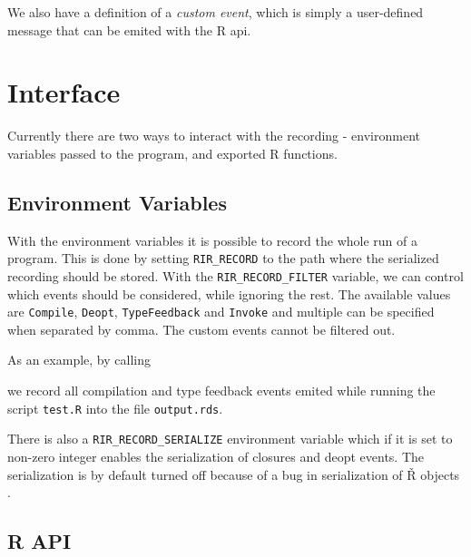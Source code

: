 We also have a definition of a \textit{custom event}, which is simply a user-defined message that can be emited with the R api.

\section{Interface}

Currently there are two ways to interact with the recording - environment variables passed to the program, and exported R functions.

\subsection*{Environment Variables}

With the environment variables it is possible to record the whole run of a program. This is done by setting \texttt{RIR\_RECORD} to the path where the serialized recording should be stored. With the \texttt{RIR\_RECORD\_FILTER} variable, we can control which events should be considered, while ignoring the rest. The available values are \texttt{Compile}, \texttt{Deopt}, \texttt{TypeFeedback} and \texttt{Invoke} and multiple can be specified when separated by comma. The custom events cannot be filtered out.

As an example, by calling


\noindent we record all compilation and type feedback events emited while running the script \texttt{test.R} into the file \texttt{output.rds}.

There is also a \texttt{RIR\_RECORD\_SERIALIZE} environment variable which if it is set to non-zero integer enables the serialization of closures and deopt events. The serialization is by default turned off because of a bug in serialization of Ř objects .

\subsection*{R API}

